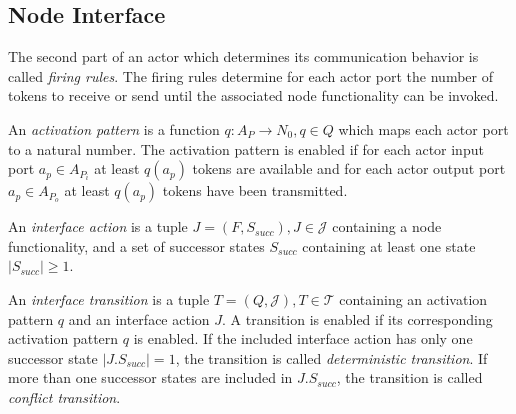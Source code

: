 \subsection{Node Interface}\label{node-interface}

The second part of an actor which determines its communication
behavior is called \emph{firing rules}. The firing rules
determine for each actor port the number of tokens to receive or send
until the associated node functionality can be invoked.


\begin{definition}\label{activation-pattern}
An \emph{activation pattern} is a function $q: A_{P} \to N_0, q \in Q$
which maps each actor port to a natural number.
The activation pattern is enabled if for each actor input port
$a_{p} \in A_{P_{i}}$ at least $q(a_{p})$ tokens are available
and for each actor output port
$a_{p} \in A_{P_{o}}$ at least $q(a_{p})$ tokens have been
transmitted.
\end{definition}

\begin{definition}\label{interface-action}
An \emph{interface action} is a tuple $J = (F,S_{succ}), J \in \mathcal{J}$ containing
a node functionality, and a set of successor states $S_{succ}$ containing at least
one state $|S_{succ}| \ge 1$.
\end{definition}

\begin{definition}\label{interface-transition}
An \emph{interface transition} is a tuple $T = (Q,\mathcal{J}), T \in \mathcal{T}$ containing
an activation pattern $q$ and an interface action $J$.
A transition is enabled if its corresponding activation pattern $q$ is enabled.
If the included interface action has only one successor state $|J.S_{succ}| = 1$, the
transition is called \emph{deterministic transition}.
If more than one successor states are included in $J.S_{succ}$, the
transition is called \emph{conflict transition}.
\end{definition}

